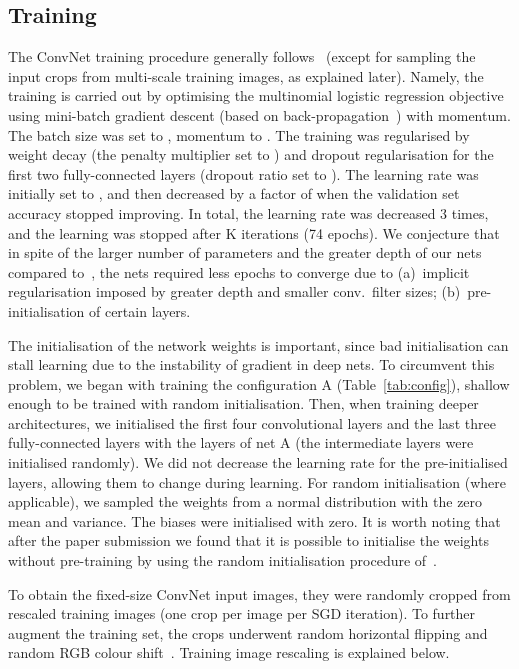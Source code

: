 \documentclass{article} \usepackage{iclr2015,times}
\newcommand{\tblref}[1]{Table~\ref{#1}}
\begin{document}
\subsection{Training}
\label{sec:train}
The ConvNet training procedure generally follows~\citet{Krizhevsky12} (except for sampling the input crops from multi-scale training images, as explained later).
Namely, the training is carried out by optimising the multinomial logistic regression objective using mini-batch gradient descent (based on back-propagation~\citep{LeCun89}) with momentum. The batch size was set to , momentum to .
The training was regularised by weight decay (the  penalty multiplier set to ) and dropout regularisation for the first two fully-connected layers (dropout ratio set to ).
The learning rate was initially set to , and then decreased
by a factor of  when the validation set accuracy stopped improving. In total, the learning rate was decreased 3 times, and the learning was stopped after K iterations
(74 epochs). We conjecture that in spite of the larger number of parameters and the greater depth of our nets compared to~\citep{Krizhevsky12}, the nets required less epochs
to converge due to (a)~implicit regularisation imposed by greater depth and smaller conv.\ filter sizes; (b)~pre-initialisation of certain layers.

The initialisation of the network weights is important, since bad initialisation can stall learning due to the instability of gradient in deep nets.
To circumvent this problem, we began with training the configuration A (\tblref{tab:config}), shallow enough to be trained with random initialisation. Then, when training deeper
architectures, we initialised the first four convolutional layers and the last three fully-connected layers with the layers of net A (the intermediate layers were
initialised randomly). We did not decrease the learning rate for the pre-initialised layers, allowing them to change during learning.
For random initialisation (where applicable), we sampled the weights from a normal distribution with the zero mean and  variance. The biases were initialised with zero.
It is worth noting that after the paper submission we found that it is possible to initialise the weights without pre-training by using the random initialisation procedure of~\citet{Glorot10}.

To obtain the fixed-size  ConvNet input images, they were randomly cropped from rescaled training images (one crop per image per SGD iteration).
To further augment the training set, the crops underwent random horizontal flipping and random RGB colour shift~\citep{Krizhevsky12}. Training image rescaling is explained below.
\end{document}
